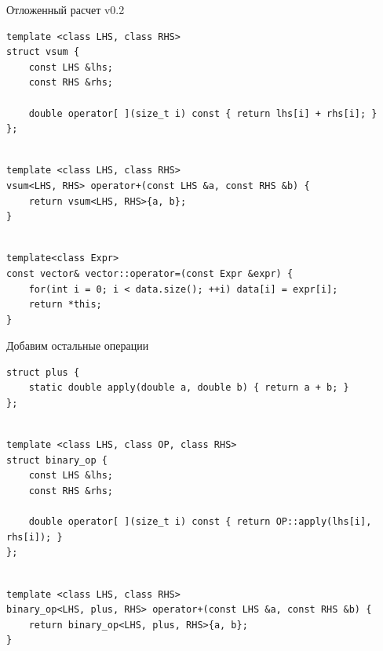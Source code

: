 \documentclass[@BEAMER_OPTIONS@]{beamer}
\begin{document}
\note{ }

\begin{frame}[fragile,shrink=2]{Отложенный расчет v0.2}
    \begin{exampleblock}{}
        \begin{lstlisting}
template <class LHS, class RHS>
struct vsum {
    const LHS &lhs;
    const RHS &rhs;

    double operator[ ](size_t i) const { return lhs[i] + rhs[i]; }
};
        \end{lstlisting}
        \pause
        \begin{lstlisting}[firstnumber=last]

template <class LHS, class RHS>
vsum<LHS, RHS> operator+(const LHS &a, const RHS &b) {
    return vsum<LHS, RHS>{a, b};
}
        \end{lstlisting}
        \pause
        \begin{lstlisting}[firstnumber=last]

template<class Expr>
const vector& vector::operator=(const Expr &expr) {
    for(int i = 0; i < data.size(); ++i) data[i] = expr[i];
    return *this;
}
        \end{lstlisting}
    \end{exampleblock}
\end{frame}

\note{ }

\begin{frame}[fragile]{Добавим остальные операции}
    \begin{exampleblock}{}
        \begin{lstlisting}
struct plus {
    static double apply(double a, double b) { return a + b; }
};
        \end{lstlisting}
        \pause
        \begin{lstlisting}[firstnumber=last]

template <class LHS, class OP, class RHS>
struct binary_op {
    const LHS &lhs;
    const RHS &rhs;

    double operator[ ](size_t i) const { return OP::apply(lhs[i], rhs[i]); }
};
        \end{lstlisting}
        \pause
        \begin{lstlisting}[firstnumber=last]

template <class LHS, class RHS>
binary_op<LHS, plus, RHS> operator+(const LHS &a, const RHS &b) {
    return binary_op<LHS, plus, RHS>{a, b};
}
        \end{lstlisting}
    \end{exampleblock}
\end{frame}
\end{document}
